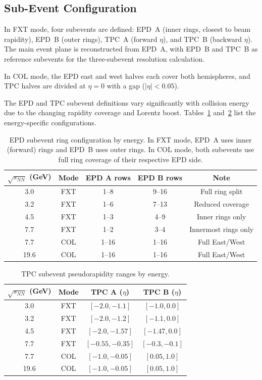 \documentclass[aps,prc,preprint,superscriptaddress,nofootinbib]{revtex4-2}
\begin{document}
\subsection{Sub-Event Configuration}
\label{subsec:subevents}

In FXT mode, four subevents are defined: EPD~A (inner rings, closest to beam rapidity), EPD~B (outer rings), TPC~A (forward $\eta$), and TPC~B (backward $\eta$). The main event plane is reconstructed from EPD~A, with EPD~B and TPC~B as reference subevents for the three-subevent resolution calculation.

In COL mode, the EPD east and west halves each cover both hemispheres, and TPC halves are divided at $\eta = 0$ with a gap ($|\eta| < 0.05$).

The EPD and TPC subevent definitions vary significantly with collision energy due to the changing rapidity coverage and Lorentz boost. Tables~\ref{tab:epd_subevents} and~\ref{tab:tpc_subevents} list the energy-specific configurations.

\begin{table}[h]
\centering
\caption{EPD subevent ring configuration by energy. In FXT mode, EPD~A uses inner (forward) rings and EPD~B uses outer rings. In COL mode, both subevents use full ring coverage of their respective EPD side.}
\label{tab:epd_subevents}
\begin{tabular}{ccccc}
\toprule
$\sqrt{s_{NN}}$ (GeV) & Mode & EPD A rows & EPD B rows & Note \\
\midrule
3.0  & FXT & 1--8  & 9--16 & Full ring split \\
3.2  & FXT & 1--6  & 7--13 & Reduced coverage \\
4.5  & FXT & 1--3  & 4--9  & Inner rings only \\
7.7  & FXT & 1--2  & 3--4  & Innermost rings only \\
7.7  & COL & 1--16 & 1--16 & Full East/West \\
19.6 & COL & 1--16 & 1--16 & Full East/West \\
\bottomrule
\end{tabular}
\end{table}

\begin{table}[h]
\centering
\caption{TPC subevent pseudorapidity ranges by energy.}
\label{tab:tpc_subevents}
\begin{tabular}{cccc}
\toprule
$\sqrt{s_{NN}}$ (GeV) & Mode & TPC A ($\eta$) & TPC B ($\eta$) \\
\midrule
3.0  & FXT & $[-2.0, -1.1]$  & $[-1.0, 0.0]$  \\
3.2  & FXT & $[-2.0, -1.2]$  & $[-1.1, 0.0]$  \\
4.5  & FXT & $[-2.0, -1.57]$ & $[-1.47, 0.0]$ \\
7.7  & FXT & $[-0.55, -0.35]$& $[-0.3, -0.1]$ \\
7.7  & COL & $[-1.0, -0.05]$ & $[0.05, 1.0]$  \\
19.6 & COL & $[-1.0, -0.05]$ & $[0.05, 1.0]$  \\
\bottomrule
\end{tabular}
\end{table}
\end{document}
